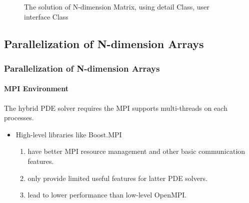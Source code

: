\begin{frame}
\begin{figure}[htbp]

    \captionsetup{width=0.8\textwidth}
    \caption{
      The solution of N-dimension Matrix, using detail Class, user interface Class 
    }
    \label{<label>}
  \end{figure}
\end{frame}







\subsection{Parallelization of N-dimension Arrays}
\begin{frame}
  \frametitle{Parallelization of N-dimension Arrays}
  \framesubtitle{MPI Environment}
  \hspace*{1em}The hybrid PDE solver requires the MPI supports multi-threads on each processes.\vspace*{1em}
  \begin{itemize}
    \item High-level libraries like Boost.MPI  
    \begin{enumerate}
      \item have better MPI resource management and other basic communication features.
      \item only provide limited useful features for latter PDE solvers.
      \item lead to lower performance than low-level OpenMPI. \vspace*{1em}
    \end{enumerate}
  \end{itemize}
  
  \vspace*{1em}\hspace*{1em}



\end{frame}


